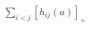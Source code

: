 \documentclass[preview]{standalone}
\begin{document}
\begin{align*}
\sum_{i<j}[h_{ij}(a)]_+
\end{align*}
\end{document}
